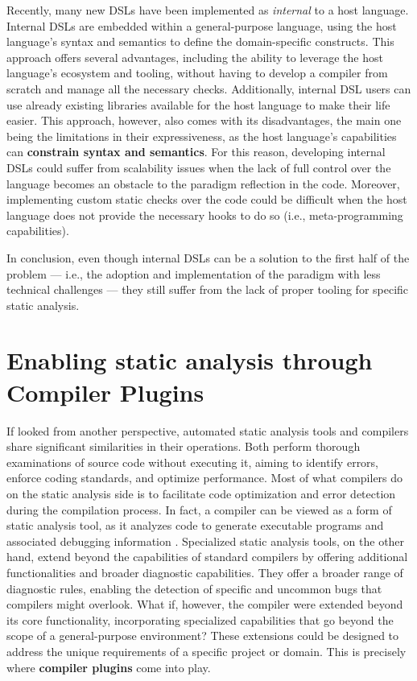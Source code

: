 \documentclass[12pt,a4paper,openright,twoside]{book}
\begin{document}
Recently, many new \acp{DSL} have been implemented as \emph{internal} to a host
language. Internal \acp{DSL} are embedded within a general-purpose language,
using the host language's syntax and semantics to define the domain-specific
constructs. This approach offers several advantages, including the ability to
leverage the host language's ecosystem and tooling, without having to develop a
compiler from scratch and manage all the necessary checks. 
%
Additionally, internal \ac{DSL} users can use already existing libraries
available for the host language to make their life easier. This approach,
however, also comes with its disadvantages, the main one being the limitations
in their expressiveness, as the host language's capabilities can
\textbf{constrain syntax and semantics}. For this reason, developing internal
\acp{DSL} could suffer from scalability issues when the lack of full control
over the language becomes an obstacle to the paradigm reflection in the code.
Moreover, implementing custom static checks over the code could be difficult
when the host language does not provide the necessary hooks to do so (i.e., 
meta-programming capabilities).

In conclusion, even though internal \acp{DSL} can be a solution to the first
half of the problem --- i.e., the adoption and implementation of the paradigm
with less technical challenges --- they still suffer from the lack of proper
tooling for specific static analysis.

\section{Enabling static analysis through Compiler Plugins}

If looked from another perspective, automated static analysis tools and
compilers share significant similarities in their operations. Both perform
thorough examinations of source code without executing it, aiming to identify
errors, enforce coding standards, and optimize performance. Most of what
compilers do on the static analysis side is to facilitate code optimization and
error detection during the compilation process. In fact, a compiler can be
viewed as a form of static analysis tool, as it analyzes code to generate
executable programs and associated debugging information
\cite{DBLP:journals/queue/Thomson21}.
%
Specialized static analysis tools, on the other hand, extend beyond the
capabilities of standard compilers by offering additional functionalities and
broader diagnostic capabilities. They offer a broader range of diagnostic rules,
enabling the detection of specific and uncommon bugs that compilers might
overlook.
%
What if, however, the compiler were extended beyond its core functionality,
incorporating specialized capabilities that go beyond the scope of a
general-purpose environment? These extensions could be designed to address the
unique requirements of a specific project or domain. This is precisely where
\textbf{compiler plugins} come into play.
\end{document}

